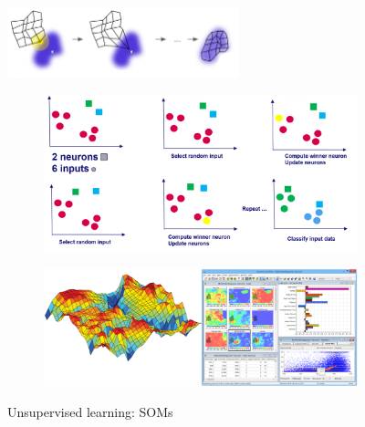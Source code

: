 \begin{figure}[H]
  \centering
  \includegraphics[width=0.6\textwidth]{assets/nn/bb__som.png}

  \vspace*{0.5cm}
  \begin{subfigure}{0.6\textwidth}
    \includegraphics[width=\textwidth]{assets/nn/bb__som_ex1.png}
  \end{subfigure}

  \vspace*{0.5cm}
  \begin{subfigure}{0.6\textwidth}
    \includegraphics[width=\textwidth]{assets/nn/bb__som_ex2.png}
  \end{subfigure}
  
  \caption{Unsupervised learning: SOMs}
  \label{fig:6_bb_som}
\end{figure}




